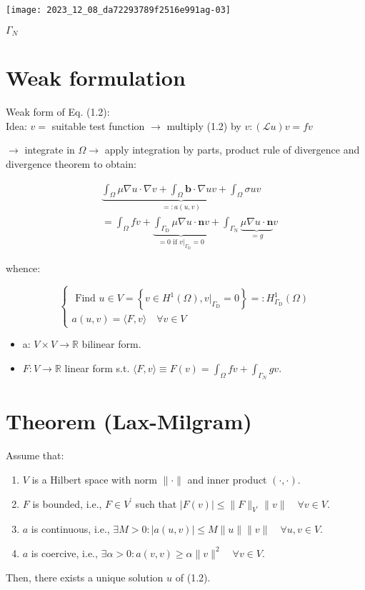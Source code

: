 \documentclass[11pt]{book}
\begin{document}
\begin{center}
\texttt{[image: 2023\_12\_08\_da72293789f2516e991ag-03]}
\end{center}

$\Gamma_{N}$

\section{Weak formulation}
Weak form of Eq. (1.2):\\
Idea: $v=$ suitable test function $\rightarrow$ multiply (1.2) by $v:(\mathcal{L} u) v=f v$

$\rightarrow$ integrate in $\Omega \rightarrow$ apply integration by parts, product rule of divergence and divergence theorem to obtain:

$$
\begin{aligned}
& \underbrace{\int_{\Omega} \mu \nabla u \cdot \nabla v+\int_{\Omega} \mathbf{b} \cdot \nabla u v+\int_{\Omega} \sigma u v}_{=: a(u, v)} \\
& =\int_{\Omega} f v+\underbrace{\int_{\Gamma_{\mathrm{D}}} \mu \nabla u \cdot \mathbf{n} v}_{=0 \text { if }\left.v\right|_{\Gamma_{\mathrm{D}}}=0}+\int_{\Gamma_{\mathrm{N}}} \underbrace{\mu \nabla u \cdot \mathbf{n}}_{=g} v
\end{aligned}
$$

whence:

$$
\left\{\begin{array}{l}
\text { Find } u \in V=\left\{v \in H^{1}(\Omega),\left.v\right|_{\Gamma_{\mathrm{D}}}=0\right\}=: H_{\Gamma_{\mathrm{D}}}^{1}(\Omega) \\
a(u, v)=\langle F, v\rangle \quad \forall v \in V
\end{array}\right.
$$
\begin{itemize}
\item  a: $V \times V \rightarrow \mathbb{R}$ bilinear form.
  \item $F: V \rightarrow \mathbb{R}$ linear form s.t. $\langle F, v\rangle \equiv F(v)=\int_{\Omega} f v+\int_{\Gamma_{N}} g v$.
\end{itemize}

\section{Theorem (Lax-Milgram)}
Assume that:
\begin{enumerate}
\item $V$ is a Hilbert space with norm $\|\cdot\|$ and inner product $(\cdot, \cdot)$.
\item $F$ is bounded, i.e., $F \in V^{\prime}$ such that $|F(v)| \leq\|F\|_{V^{\prime}}\|v\| \quad \forall v \in V$.
\item $a$ is continuous, i.e., $\exists M>0:|a(u, v)| \leq M\|u\|\|v\| \quad \forall u, v \in V$.
\item $a$ is coercive, i.e., $\exists \alpha>0: a(v, v) \geq \alpha\|v\|^{2} \quad \forall v \in V$.
\end{enumerate}
Then, there exists a unique solution $u$ of (1.2).\\ \\
\end{document}
